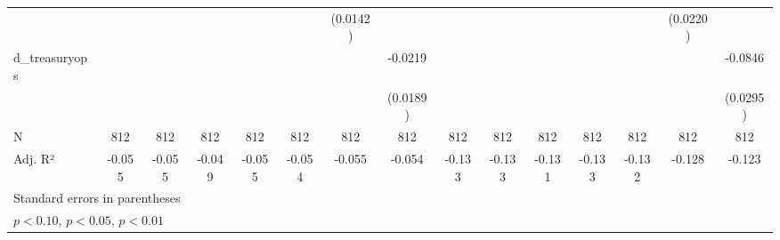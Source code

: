 {\begin{tabular}{l*{14}{c}}
                    &                     &                     &                     &                     &                     &    (0.0142)         &                     &                     &                     &                     &                     &                     &    (0.0220)         &                     \\
d\_treasuryops       &                     &                     &                     &                     &                     &                     &     -0.0219         &                     &                     &                     &                     &                     &                     &     -0.0846\sym{***}\\
                    &                     &                     &                     &                     &                     &                     &    (0.0189)         &                     &                     &                     &                     &                     &                     &    (0.0295)         \\
\hline
N                   &         812         &         812         &         812         &         812         &         812         &         812         &         812         &         812         &         812         &         812         &         812         &         812         &         812         &         812         \\
Adj. R²             &      -0.055         &      -0.055         &      -0.049         &      -0.055         &      -0.054         &      -0.055         &      -0.054         &      -0.133         &      -0.133         &      -0.131         &      -0.133         &      -0.132         &      -0.128         &      -0.123         \\
\hline\hline
\multicolumn{15}{l}{\footnotesize Standard errors in parentheses}\\
\multicolumn{15}{l}{\footnotesize \sym{*} \(p<0.10\), \sym{**} \(p<0.05\), \sym{***} \(p<0.01\)}\\
\end{tabular}
}
